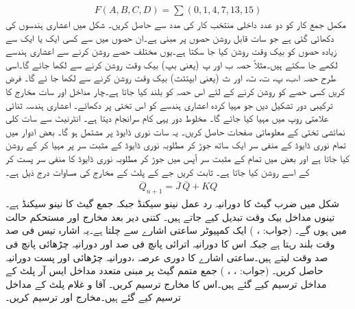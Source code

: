  \begin{align*}
 F(A,B,C,D)=\sum(0,1,4,7,13,15)
 \end{align*}
 مکمل جمع کار کو دو عدد داخلی منتخب کار کی مدد سے حاصل کریں۔
 شکل میں اعشاری ہندسوں کی   دکھائی  گئی ہے جو سات قابل روشن حصوں پر مبنی ہے۔ان حصوں میں سے  کسی ایک یا ایک سے زیادہ حصوں کو بیک وقت روشن کیا جا سکتا  ہے۔یوں مختلف حصے روشن کرنے سے اعشاری ہندسے لکھے جا  سکتے ہیں۔مثلاً   حصہ ب اور پ  (یعنی بپ)  بیک وقت روشن کرنے سے    لکھا جائے گا۔اسی طرح حصہ ا،ب،  پ، ت، ٹ، اور  ث (یعنی ابپتٹث)   بیک  وقت روشن کرنے سے  لکھا جا ئے گا۔   فرض کریں کسی حصے کو  روشن کرنے کے لئے اس حصہ  کو  بلند کیا جاتا ہے۔چار مداخل اور سات مخارج  کا   ترکیبی  دور تشکیل دیں جو مہیا کردہ اعشاری ہندسے کو اس تختی پر دکھائے۔ اعشاری ہندسہ  ثنائی علامتی روپ میں مہیا کیا جائے گا۔   مخلوط دور   یہی کام  سرانجام   دیتا ہے۔
 انٹرنیٹ سے سات کلی  نمائشی تختی کے معلوماتی صفحات حاصل کریں۔ یہ سات نوری ڈایوڈ  پر  مشتمل ہو گا۔ بعض ادوار میں تمام نوری ڈایوڈ کے منفی سر ایک ساتھ جوڑ  کر  مطلوبہ نوری ڈایوڈ کے مثبت سر پر  مہیا   کر کے روشن کیا جاتا ہے اور بعض میں تمام کے مثبت سر آپس میں جوڑ کر مطلوبہ نوری ڈایوڈ کا  منفی سر پست کر کے اسے روشن کیا جاتا ہے۔
 ثابت کریں  جے کے پلٹ کے مخارج   کی مساوات    درج ذیل ہے۔
 \begin{align*}
 \overline{Q}_{n+1}=\overline{J}\,\overline{Q}+KQ
 \end{align*}
 شکل میں ضرب گیٹ کا دورانیہ رد عمل   نینو سیکنڈ جبکہ جمع گیٹ کا  نینو سیکنڈ ہے۔تینوں مداخل بیک وقت تبدیل کیے جاتے ہیں۔ کتنی دیر بعد مخارج  اور   مستحکم حالت میں ہوں گے۔ (جواب:  ، )
 ایک کمپیوٹر    ساعتی اشارے  سے چلتا ہے۔یہ  اشارہ تیس فی صد وقت بلند رہتا ہے جبکہ اس کا دورانیہ اترائی  پانچ فی صد اور دورانیہ چڑھائی پانچ فی صد وقت لیتے ہیں۔ساعتی اشارے  کا دوری عرصہ ،دورانیہ چڑھائی اور پست دورانیہ حاصل کریں۔ (جواب:  ،  ، )
 جمع متمم گیٹ پر مبنی متعدد  مداخل ایس آر پلٹ کے مداخل  ترسیم کیے گئے ہیں۔اس کا مخارج  ترسیم کریں۔
 آقا و غلام پلٹ کے مداخل  ترسیم  کیے گئے ہیں۔مخارج اور  ترسیم کریں۔
